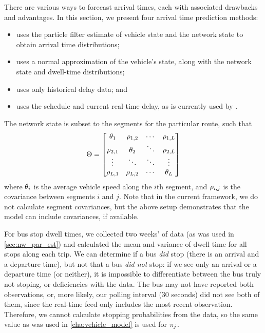 There are various ways to forecast arrival times, each with associated drawbacks and advantages. In this section, we present four arrival time prediction methods:
\begin{itemize}
\item \Fpf{} uses the particle filter estimate of vehicle state and the network state to obtain arrival time distributions;
\item \Fnorm{} uses a normal approximation of the vehicle's state, along with the network state and dwell-time distributions;
\item \Fhist{} uses only historical delay data; and
\item \Fsched{} uses the schedule and current real-time delay, as is currently used by \AT{}.
\end{itemize}


The network state is subset to the segments for the particular route, such that
\begin{equation}
\label{eq:route_nw_state}
\Theta =
\begin{bmatrix}
\theta_{1} & \rho_{1,2} & \cdots &\rho_{1,L} \\
\rho_{2,1} & \theta_{2} & \ddots &\rho_{2,L} \\
\vdots & \ddots & \ddots & \vdots \\
\rho_{L,1} & \rho_{L,2} & \cdots & \theta_L
\end{bmatrix}
\end{equation}
where $\theta_{i}$ is the average vehicle speed along the $i$th segment, and $\rho_{i,j}$ is the covariance between segments $i$ and $j$. Note that in the current framework, we do not calculate segment covariances, but the above setup demonstrates that the model can include covariances, if available.

For bus stop dwell times, we collected two weeks' of data (as was used in \cref{sec:nw_par_est}) and calculated the mean and variance of dwell time for all stops along each trip. We can determine if a bus \emph{did} stop (there is an arrival and a departure time), but not that a bus \emph{did not} stop: if we see only an arrival or a departure time (or neither), it is impossible to differentiate between the bus truly not stoping, or deficiencies with the data. The bus may not have reported both observations, or, more likely, our polling interval (30 seconds) did not see both of them, since the real-time feed only includes the most recent observation. Therefore, we cannot calculate stopping probabilities from the data, so the same value as was used in \cref{cha:vehicle_model} is used for $\pi_j$.

